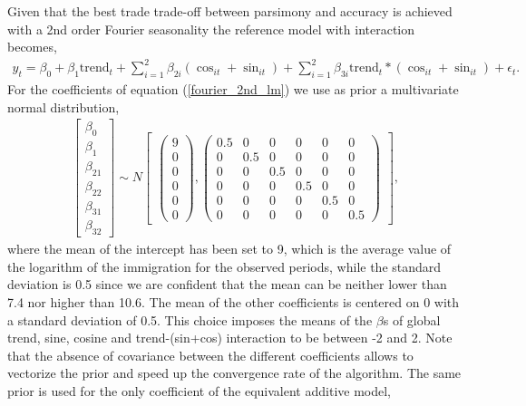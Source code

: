 \documentclass{article}\usepackage[]{graphicx}\usepackage[]{color}
\begin{document}
Given that the best trade trade-off between parsimony and accuracy is achieved with a 2nd order Fourier seasonality the reference model with interaction becomes,
\begin{align}\label{fourier_2nd_lm}
y_{t}= \beta_0 + \beta_1 \text{trend}_t + \sum_{i=1}^2 \beta_{2i} (\cos_{it} + \sin_{it}) + \sum_{i=1}^2 \beta_{3i} \text{trend}_t* (\cos_{it} + \sin_{it}) + \epsilon_{t}.
\end{align}
For the coefficients of equation (\ref{fourier_2nd_lm}) we use as prior a multivariate normal distribution,  
\begin{align}\label{matrix prior2}
\begin{bmatrix}
\beta_{0} \\
\beta_{1}\\
\beta_{21}\\
\beta_{22}\\
\beta_{31} \\
\beta_{32} 
\end{bmatrix}
\sim N
\begin{bmatrix}
\begin{pmatrix}
9 \\
0 \\
0 \\
0 \\
0 \\
0 
\end{pmatrix}
,
\begin{pmatrix}
0.5 & 0 & 0 & 0 & 0 & 0  \\ 
0 & 0.5 & 0 & 0 & 0 & 0  \\
0 & 0 & 0.5 & 0 & 0 & 0  \\
0 & 0 & 0 & 0.5 & 0 & 0  \\
0 & 0 & 0 & 0 & 0.5 & 0 \\
0 & 0 & 0 & 0 &  0  & 0.5
\end{pmatrix}
\end{bmatrix},
\end{align}
where the mean of the intercept has been set to 9, which is the average value of the logarithm of the immigration for the observed periods, while the standard deviation is 0.5 since we are confident that the mean can be neither lower than 7.4 nor higher than 10.6. The mean of the other coefficients is centered on 0 with a standard deviation of 0.5. This choice imposes the means of the $\beta$s of global trend, sine, cosine and trend-(sin+cos) interaction to be between -2 and 2. Note that the absence of covariance between the different coefficients allows to vectorize the prior and speed up the convergence rate of the algorithm. The same prior is used for the only coefficient of the equivalent additive model,
\end{document}
